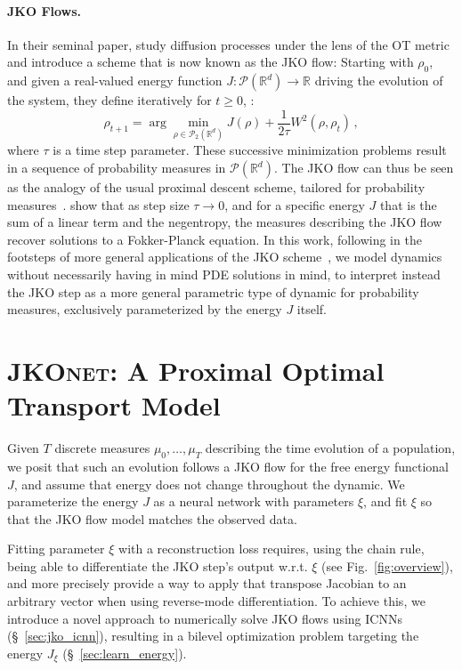 \paragraph{JKO Flows.}
In their seminal paper, \citet{jordan1998variational} study diffusion processes under the lens of the OT metric \citep[see also][]{ambrosio2006gradient} and introduce a scheme that is now known as the JKO flow: Starting with $\rho_0$, and given a real-valued energy function $J:\mathcal{P}(\mathbb{R}^d)\rightarrow \mathbb{R}$ driving the evolution of the system, they define iteratively for $t\geq 0$, :
\begin{equation} \label{eq:jko}
    \rho_{t+1} = \arg \min_{\rho\in \mathcal{P}_2(\mathbb{R}^d)} J(\rho) + \frac{1}{2\tau} W^2(\rho, \rho_{t})\,,
\end{equation}
where $\tau$ is a time step parameter. These successive minimization problems result in a sequence of probability measures in $\mathcal{P}(\mathbb{R}^d)$. The JKO flow can thus be seen as the analogy of the usual proximal descent scheme, tailored for probability measures~\citep[p.285]{santambrogio2015optimal}. \citet{jordan1998variational} show that as step size $\tau \rightarrow 0$, and for a specific energy $J$ that is the sum of a linear term and the negentropy, the measures describing the JKO flow recover solutions to a Fokker-Planck equation. In this work, following in the footsteps of more general applications of the JKO scheme~\citep[\S4.8]{santambrogio2017euclidean}, we model dynamics without necessarily having in mind PDE solutions in mind, to interpret instead the JKO step as a more general parametric type of dynamic for probability measures, exclusively parameterized by the energy $J$ itself.


\section{\textsc{JKOnet}: A Proximal Optimal Transport Model} 

Given $T$ discrete measures $\mu_0, \dots, \mu_T$ describing the time evolution of a population, we posit that such an evolution follows a JKO flow for the free energy functional $J$, and assume that energy does not change throughout the dynamic. We parameterize the energy $J$ as a neural network with parameters $\xi$, and fit $\xi$ so that the JKO flow model matches the observed data. 

Fitting parameter $\xi$ with a reconstruction loss requires, using the chain rule, being able to differentiate the JKO step's output w.r.t. $\xi$ (see Fig.~\ref{fig:overview}), and more precisely provide a way to apply that transpose Jacobian to an arbitrary vector when using reverse-mode differentiation. To achieve this, we introduce a novel approach to numerically solve JKO flows using ICNNs (\S~\ref{sec:jko_icnn}), resulting in a bilevel optimization problem targeting the energy $J_\xi$ (\S~\ref{sec:learn_energy}).

